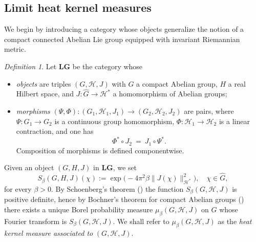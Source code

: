 \documentclass[11pt,reqno]{amsart}
\numberwithin{equation}{section}
\theoremstyle{remark}
\theoremstyle{rmdefinition}
\newtheorem{definition}[theorem]{Definition}
\begin{document}
\subsection{Limit heat kernel measures}\label{limkermesse}
We begin by introducing a category whose objects generalize the notion of a compact connected Abelian Lie group equipped with invariant Riemannian metric.
\begin{definition}
Let $\mathbf{LG}$ be the category whose
\begin{itemize}
	\item \emph{objects} are triples $(G,\mathcal H,J)$ with
	$G$ a compact Abelian group, $H$ a real Hilbert space, and $J:\widehat{G}\to \mathcal H^{\ast}$ a homomorphism of Abelian groups;
	\item \emph{morphisms} $(\Psi,\Phi):(G_1,\mathcal H_1,J_1)\to (G_2, \mathcal H_2,J_2)$ are pairs, where
	$\Psi:G_1\to G_2$ is a continuous group homomorphism, $\Phi:\mathcal H_1\to \mathcal H_2$ is a linear contraction, and one has
	\begin{equation}\label{morcompat}
		\Phi^{\ast}\circ J_2\ =\ J_1\circ \Psi^{\ast}.
	\end{equation}
	Composition of morphisms is defined componentwise.
\end{itemize}
\end{definition}
Given an object $(G,H,J)$ in $\mathbf{LG}$, we set 
$$ S_\beta(G,H,J)(\chi):= \exp\big(-4\pi^{2}\beta \|J(\chi)\|_{\mathcal H^{\ast}}^{2}\big), \quad \chi \in \widehat{G},$$
for every $\beta>0$.  By Schoenberg's theorem (\cite[Chapter 3, Theorem 2.2]{BCR}) the function $S_\beta(G,\mathcal H,J)$ is positive definite, hence by  Bochner's theorem for compact Abelian groups (\cite[Theorem 4.19]{Fo}) there exists a unique Borel probability measure $\mu_{\beta}(G,\mathcal H,J)$ on $G$ whose Fourier transform is $S_\beta(G,\mathcal H,J)$. We shall refer to $\mu_\beta(G,\mathcal H,J)$ as the {\em heat kernel measure associated to} $(G,\mathcal H,J)$.
\end{document}
